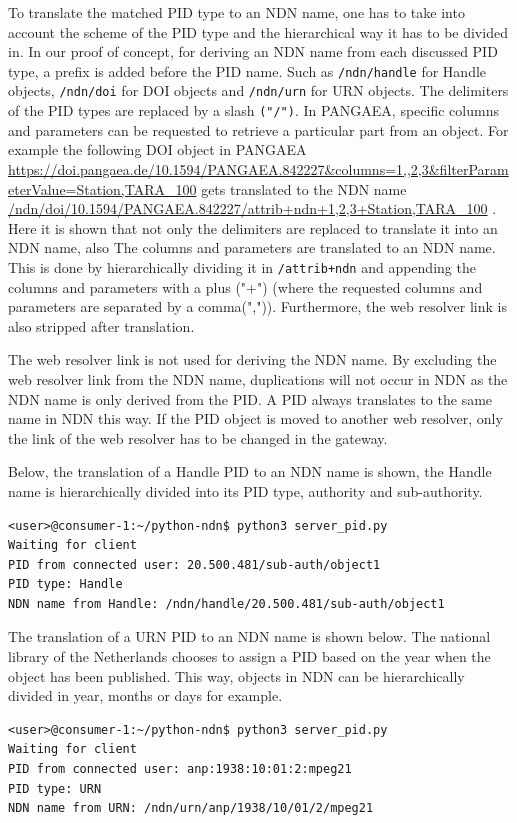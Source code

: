 To translate the matched PID type to an NDN name, one has to take into account the scheme of the PID type and the hierarchical way it has to be divided in. In our proof of concept, for deriving an NDN name from each discussed PID type, a prefix is added before the PID name. Such as \texttt{/ndn/handle} for Handle objects, \texttt{/ndn/doi} for DOI objects and \texttt{/ndn/urn} for URN objects. The delimiters of the PID types are replaced by a slash \texttt{("/")}. In PANGAEA, specific columns and parameters can be requested  to retrieve a particular part from an object. For example the following DOI object in PANGAEA \url{https://doi.pangaea.de/10.1594/PANGAEA.842227&columns=1,,2,3&filterParameterValue=Station,TARA_100} gets translated to the NDN name \url{/ndn/doi/10.1594/PANGAEA.842227/attrib+ndn+1,2,3+Station,TARA_100} \cite{ndn-app-aware}. Here it is shown that not only the delimiters are replaced to translate it into an NDN name, also The columns and parameters are translated to an NDN name. This is done by hierarchically dividing it in \texttt{/attrib+ndn} and appending the columns and parameters with a plus ("+") (where the requested columns and parameters are separated by a comma(",")). Furthermore, the web resolver link is also stripped after translation.

The web resolver link is not used for deriving the NDN name.
By excluding the web resolver link from the NDN name, duplications will not occur in NDN as the NDN name is only derived from the PID. A PID always translates to the same name in NDN this way. 
If the PID object is moved to another web resolver, only the link of the web resolver has to be changed in the gateway. 

Below, the translation of a Handle PID to an NDN name is shown, the Handle name is hierarchically divided into its PID type, authority and sub-authority.
\vspace{1em}
\begin{lstlisting}[frame=single,gobble=0,basicstyle=\scriptsize\ttfamily]
<user>@consumer-1:~/python-ndn$ python3 server_pid.py
Waiting for client
PID from connected user: 20.500.481/sub-auth/object1
PID type: Handle
NDN name from Handle: /ndn/handle/20.500.481/sub-auth/object1
\end{lstlisting}

The translation of a URN PID to an NDN name is shown below. The national library of the Netherlands chooses to assign a PID based on the year when the object has been published. 
This way, objects in NDN can be hierarchically divided in year, months or days for example.
\vspace{1em}
\begin{lstlisting}[frame=single,gobble=0,basicstyle=\scriptsize\ttfamily]
<user>@consumer-1:~/python-ndn$ python3 server_pid.py
Waiting for client
PID from connected user: anp:1938:10:01:2:mpeg21
PID type: URN
NDN name from URN: /ndn/urn/anp/1938/10/01/2/mpeg21
\end{lstlisting}

